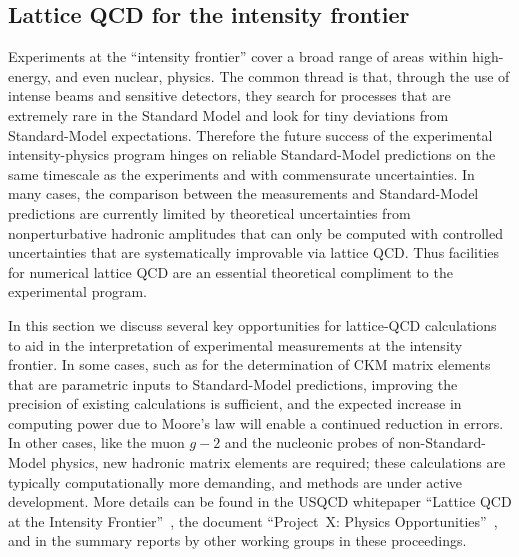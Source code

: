 \subsection{Lattice QCD for the intensity frontier}
\label{subsec:lqcd:IF}

Experiments at the ``intensity frontier'' cover a broad range of areas within
high-energy, and even nuclear, physics.  The common thread is that, through
the use of intense beams and sensitive detectors, they search for processes
that are extremely rare in the Standard Model and look for tiny deviations
from Standard-Model expectations.  Therefore the future success of the
experimental intensity-physics program hinges on reliable Standard-Model
predictions on the same timescale as the experiments and with commensurate
uncertainties.  In many cases, the comparison between the measurements and
Standard-Model predictions are currently limited by theoretical uncertainties
from nonperturbative hadronic amplitudes that can only be computed with
controlled uncertainties that are systematically improvable via lattice QCD.
Thus facilities for numerical lattice QCD are an essential theoretical
compliment to the experimental program.
  
In this section we discuss several key opportunities for lattice-QCD
calculations to aid in the interpretation of experimental measurements at the
intensity frontier.  In some cases, such as for the determination of CKM
matrix elements that are parametric inputs to Standard-Model predictions,
improving the precision of existing calculations is sufficient, and the
expected increase in computing power due to Moore's law will enable a
continued reduction in errors.  In other cases, like the muon $g-2$ and the
nucleonic probes of non-Standard-Model physics, new hadronic matrix elements
are required; these calculations are typically computationally more demanding,
and methods are under active development.  More details can be found in the
USQCD whitepaper ``Lattice QCD at the Intensity
Frontier''~\cite{USQCD_IF_whitepaper13}, the document ``Project~X: Physics
Opportunities''~\cite{Kronfeld:2013uoa}, and in the summary reports by other
working groups in these proceedings.

